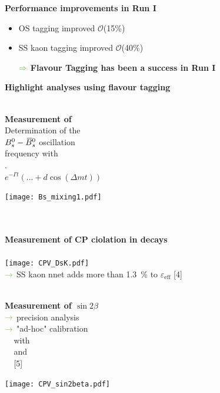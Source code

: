 {\begin{minipage}{0.474\boxwidth}
\begin{center}
\end{center}
\textbf{Performance improvements in Run I}
\begin{itemize}
\setlength\itemsep{0.01em}
\vspace{-0.3em}
\item OS tagging improved $\mathcal{O}$(15\%) 
\item SS kaon tagging improved $\mathcal{O}$(40\%)
\vspace{0.5em}
\setlength{\itemindent}{.14in}
\item[$\color{tu_gruen}\Rightarrow$] \textbf{Flavour Tagging has been a success in Run I}
\end{itemize}
\end{minipage}
\vspace{0.6em}
\hfill
\begin{minipage}{0.474\boxwidth}
\textbf{Highlight analyses using flavour tagging}\\
\vspace{-0.05em}\\
\parbox{0.190\boxwidth}{\textbf{\vspace{0.4em}Measurement of \dms}\\Determination of the\\ $B^0_s-\kern 0.18em\overline{\kern -0.18em B}{}^0_s$ oscillation\\ frequency with\\ \BsToDspi [3].\vspace{0.5em}\\$e^{-\Gamma t}\left(...+\!d\cos\left(\Delta mt\right)\right)$}
\hspace{0.25em}
\parbox{0.474\textwidth}{\texttt{[image: Bs\_mixing1.pdf]}}\\
\vspace{0.25em}\\
\textbf{Measurement of CP ciolation in \BsToDsK decays}\\
\vspace{-0.35em}\\
\texttt{[image: CPV\_DsK.pdf]}\\
${\color{tu_gruen}\rightarrow}$ SS kaon nnet adds more than 1.3\, \% to $\varepsilon_\text{eff}$ [4]\\
\vspace{-0.35em}\\
\parbox[c]{0.197\boxwidth}{\textbf{\vspace{0.4em}Measurement of $\sin2\beta$}\\${\color{tu_gruen}\rightarrow}$ precision analysis\\${\color{tu_gruen}\rightarrow}$ "ad-hoc" calibration\\ ${\color{white}\rightarrow}$with \BuToJPsiKp\\${\color{white}\rightarrow}$and \BdToJPsiKst\\${\color{white}\rightarrow}$[5]}
\hspace{0.25em}
\parbox[c]{0.474\textwidth}{\texttt{[image: CPV\_sin2beta.pdf]}}
\end{minipage}
\vspace{-0.5em}
}
